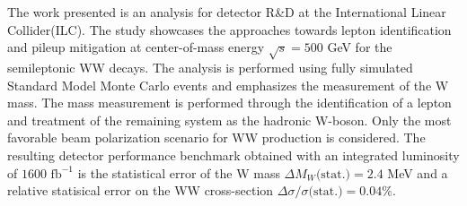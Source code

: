 %

%

The work presented is an analysis for detector R\&D at the International Linear Collider(ILC). The study showcases the approaches towards lepton identification and pileup mitigation at center-of-mass energy $\sqrt{s} = 500$ GeV for the semileptonic WW decays. The analysis is performed using fully simulated Standard Model Monte Carlo events and emphasizes the measurement of the W mass. The mass measurement is performed through the identification of a lepton and treatment of the remaining system as the hadronic W-boson. Only the most favorable beam polarization scenario for WW production is considered. The resulting detector performance benchmark obtained with an integrated luminosity of $1600 \, \, \text{fb}^{-1}$ is the statistical error of the W mass $\Delta M_W\text{(stat.)} =  2.4 $ MeV and a relative statisical error on the WW cross-section $\Delta \sigma / \sigma \text{(stat.)} = 0.04 \% $. 

